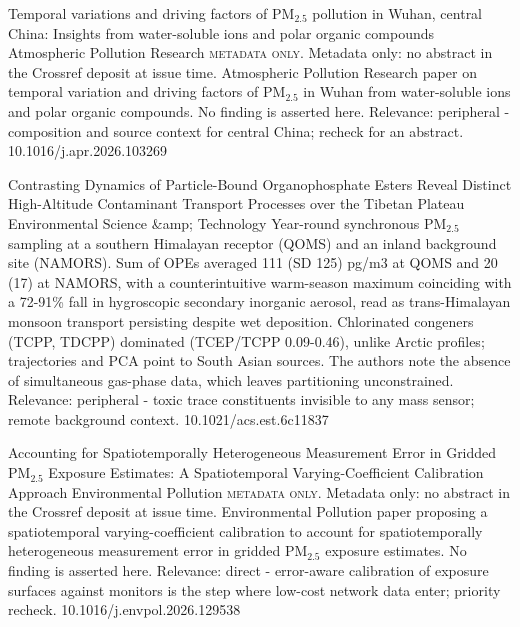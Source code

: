 \documentclass[10pt]{article}
\begin{document}
{Temporal variations and driving factors of PM$_{2.5}$ pollution in Wuhan, central China: Insights from water-soluble ions and polar organic compounds}
{Atmospheric Pollution Research}
{\textsc{metadata only.} Metadata only: no abstract in the Crossref deposit at issue time. Atmospheric Pollution Research paper on temporal variation and driving factors of PM$_{2.5}$ in Wuhan from water-soluble ions and polar organic compounds. No finding is asserted here. Relevance: peripheral - composition and source context for central China; recheck for an abstract.}
{10.1016/j.apr.2026.103269}

{Contrasting Dynamics of Particle-Bound Organophosphate Esters Reveal Distinct High-Altitude Contaminant Transport Processes over the Tibetan Plateau}
{Environmental Science \&amp; Technology}
{Year-round synchronous PM$_{2.5}$ sampling at a southern Himalayan receptor (QOMS) and an inland background site (NAMORS). Sum of OPEs averaged 111 (SD 125) pg/m3 at QOMS and 20 (17) at NAMORS, with a counterintuitive warm-season maximum coinciding with a 72-91\% fall in hygroscopic secondary inorganic aerosol, read as trans-Himalayan monsoon transport persisting despite wet deposition. Chlorinated congeners (TCPP, TDCPP) dominated (TCEP/TCPP 0.09-0.46), unlike Arctic profiles; trajectories and PCA point to South Asian sources. The authors note the absence of simultaneous gas-phase data, which leaves partitioning unconstrained. Relevance: peripheral - toxic trace constituents invisible to any mass sensor; remote background context.}
{10.1021/acs.est.6c11837}

{Accounting for Spatiotemporally Heterogeneous Measurement Error in Gridded PM$_{2.5}$ Exposure Estimates: A Spatiotemporal Varying-Coefficient Calibration Approach}
{Environmental Pollution}
{\textsc{metadata only.} Metadata only: no abstract in the Crossref deposit at issue time. Environmental Pollution paper proposing a spatiotemporal varying-coefficient calibration to account for spatiotemporally heterogeneous measurement error in gridded PM$_{2.5}$ exposure estimates. No finding is asserted here. Relevance: direct - error-aware calibration of exposure surfaces against monitors is the step where low-cost network data enter; priority recheck.}
{10.1016/j.envpol.2026.129538}
\end{document}
